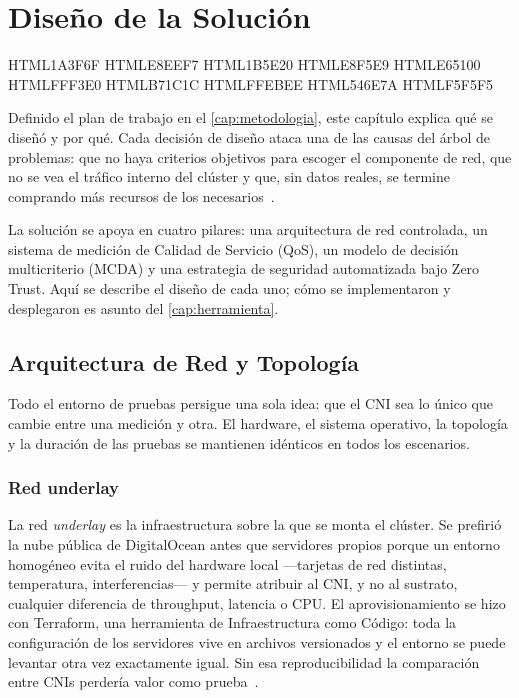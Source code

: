 \chapter{Diseño de la Solución} \label{sec:Metodos}

\definecolor{oe3azul}    {HTML}{1A3F6F}   %
\definecolor{oe3azulcl}  {HTML}{E8EEF7}   %
\definecolor{oe3verde}   {HTML}{1B5E20}   %
\definecolor{oe3verdecl} {HTML}{E8F5E9}
\definecolor{oe3ambar}   {HTML}{E65100}   %
\definecolor{oe3ambarcl} {HTML}{FFF3E0}
\definecolor{oe3rojo}    {HTML}{B71C1C}   %
\definecolor{oe3rojocl}  {HTML}{FFEBEE}
\definecolor{oe3gris}    {HTML}{546E7A}   %
\definecolor{oe3griscl}  {HTML}{F5F5F5}  %

Definido el plan de trabajo en el \cref{cap:metodologia}, este capítulo explica qué se diseñó y por qué. Cada decisión de diseño ataca una de las causas del árbol de problemas: que no haya criterios objetivos para escoger el componente de red, que no se vea el tráfico interno del clúster y que, sin datos reales, se termine comprando más recursos de los necesarios~\cite{ref29}.

La solución se apoya en cuatro pilares: una arquitectura de red controlada, un sistema de medición de Calidad de Servicio (QoS), un modelo de decisión multicriterio (MCDA) y una estrategia de seguridad automatizada bajo Zero Trust. Aquí se describe el diseño de cada uno; cómo se implementaron y desplegaron es asunto del \cref{cap:herramienta}.

\section{Arquitectura de Red y Topología}

Todo el entorno de pruebas persigue una sola idea: que el CNI sea lo único que cambie entre una medición y otra. El hardware, el sistema operativo, la topología y la duración de las pruebas se mantienen idénticos en todos los escenarios.

\subsection{Red underlay}

La red \emph{underlay} es la infraestructura sobre la que se monta el clúster. Se prefirió la nube pública de DigitalOcean antes que servidores propios porque un entorno homogéneo evita el ruido del hardware local ---tarjetas de red distintas, temperatura, interferencias--- y permite atribuir al CNI, y no al sustrato, cualquier diferencia de throughput, latencia o CPU. El aprovisionamiento se hizo con Terraform, una herramienta de Infraestructura como Código: toda la configuración de los servidores vive en archivos versionados y el entorno se puede levantar otra vez exactamente igual. Sin esa reproducibilidad la comparación entre CNIs perdería valor como prueba~\cite{ref7}.

